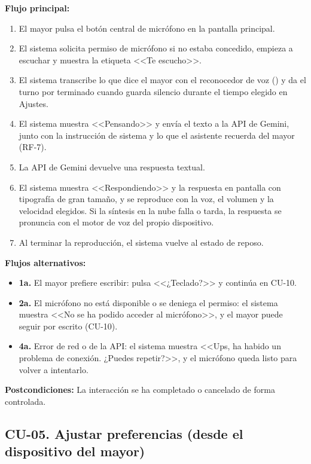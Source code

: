 \noindent\textbf{Flujo principal:}
\begin{enumerate}[nosep]
    \item El mayor pulsa el botón central de micrófono en la pantalla principal.
    \item El sistema solicita permiso de micrófono si no estaba concedido, empieza a escuchar y muestra la etiqueta <<Te escucho>>.
    \item El sistema transcribe lo que dice el mayor con el reconocedor de voz () y da el turno por terminado cuando guarda silencio durante el tiempo elegido en Ajustes.
    \item El sistema muestra <<Pensando>> y envía el texto a la API de Gemini, junto con la instrucción de sistema y lo que el asistente recuerda del mayor (RF-7).
    \item La API de Gemini devuelve una respuesta textual.
    \item El sistema muestra <<Respondiendo>> y la respuesta en pantalla con tipografía de gran tamaño, y se reproduce con la voz, el volumen y la velocidad elegidos. Si la síntesis en la nube falla o tarda, la respuesta se pronuncia con el motor de voz del propio dispositivo.
    \item Al terminar la reproducción, el sistema vuelve al estado de reposo.
\end{enumerate}

\noindent\textbf{Flujos alternativos:}
\begin{itemize}[nosep]
    \item \textbf{1a.} El mayor prefiere escribir: pulsa <<¿Teclado?>> y continúa en CU-10.
    \item \textbf{2a.} El micrófono no está disponible o se deniega el permiso: el sistema muestra <<No se ha podido acceder al micrófono>>, y el mayor puede seguir por escrito (CU-10).
    \item \textbf{4a.} Error de red o de la API: el sistema muestra <<Ups, ha habido un problema de conexión. ¿Puedes repetir?>>, y el micrófono queda listo para volver a intentarlo.
\end{itemize}

\noindent\textbf{Postcondiciones:} La interacción se ha completado o cancelado de forma controlada.

\bigskip

\subsection*{CU-05. Ajustar preferencias (desde el dispositivo del mayor)}

